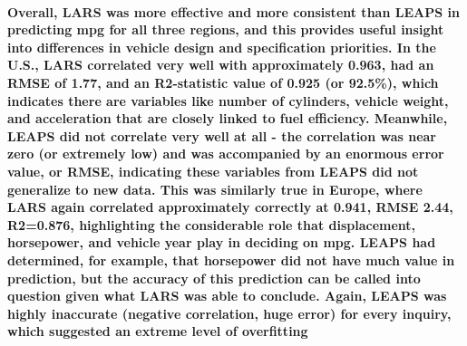 \documentclass[
]{article}
\begin{document}
\paragraph{Overall, LARS was more effective and more consistent than
LEAPS in predicting mpg for all three regions, and this provides useful
insight into differences in vehicle design and specification priorities.
In the U.S., LARS correlated very well with approximately 0.963, had an
RMSE of 1.77, and an R2-statistic value of 0.925 (or 92.5\%), which
indicates there are variables like number of cylinders, vehicle weight,
and acceleration that are closely linked to fuel efficiency. Meanwhile,
LEAPS did not correlate very well at all - the correlation was near zero
(or extremely low) and was accompanied by an enormous error value, or
RMSE, indicating these variables from LEAPS did not generalize to new
data. This was similarly true in Europe, where LARS again correlated
approximately correctly at 0.941, RMSE 2.44, R2=0.876, highlighting the
considerable role that displacement, horsepower, and vehicle year play
in deciding on mpg. LEAPS had determined, for example, that horsepower
did not have much value in prediction, but the accuracy of this
prediction can be called into question given what LARS was able to
conclude. Again, LEAPS was highly inaccurate (negative correlation, huge
error) for every inquiry, which suggested an extreme level of
overfitting}\label{overall-lars-was-more-effective-and-more-consistent-than-leaps-in-predicting-mpg-for-all-three-regions-and-this-provides-useful-insight-into-differences-in-vehicle-design-and-specification-priorities.-in-the-u.s.-lars-correlated-very-well-with-approximately-0.963-had-an-rmse-of-1.77-and-an-r2-statistic-value-of-0.925-or-92.5-which-indicates-there-are-variables-like-number-of-cylinders-vehicle-weight-and-acceleration-that-are-closely-linked-to-fuel-efficiency.-meanwhile-leaps-did-not-correlate-very-well-at-all---the-correlation-was-near-zero-or-extremely-low-and-was-accompanied-by-an-enormous-error-value-or-rmse-indicating-these-variables-from-leaps-did-not-generalize-to-new-data.-this-was-similarly-true-in-europe-where-lars-again-correlated-approximately-correctly-at-0.941-rmse-2.44-r20.876-highlighting-the-considerable-role-that-displacement-horsepower-and-vehicle-year-play-in-deciding-on-mpg.-leaps-had-determined-for-example-that-horsepower-did-not-have-much-value-in-prediction-but-the-accuracy-of-this-prediction-can-be-called-into-question-given-what-lars-was-able-to-conclude.-again-leaps-was-highly-inaccurate-negative-correlation-huge-error-for-every-inquiry-which-suggested-an-extreme-level-of-overfitting}
\end{document}

